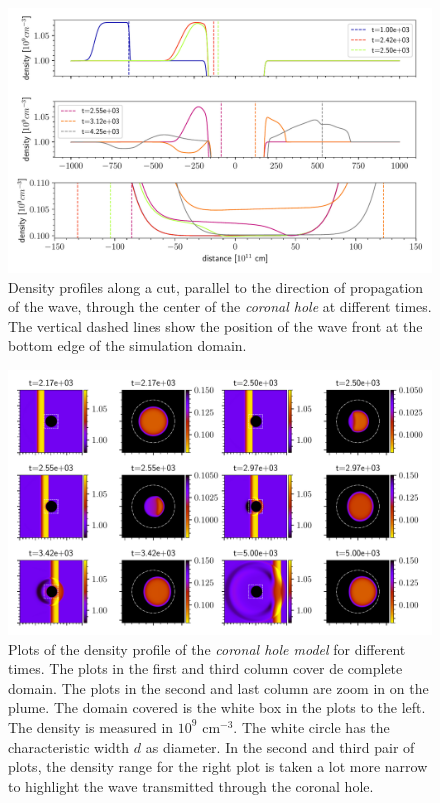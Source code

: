 \begin{figure}[H]
	\centering
	\includegraphics[width=\linewidth]{images/hole-sections.pdf}
	\caption{Density profiles along a cut, parallel to the direction of propagation of the wave, through the center of the \emph{coronal hole} at different times. The vertical dashed lines show the position of the wave front at the bottom edge of the simulation domain.}
	\label{fig:hole-sections}
\end{figure}

\begin{figure}[H]
	\centering
	\includegraphics[width=\linewidth]{images/hole-frames.pdf}
	\caption{Plots of the density profile of the \emph{coronal hole model} for different times. 
	The plots in the first and third column cover de complete domain.
	The plots in the second and last column are zoom in on the plume. 
	The domain covered is the white box in the plots to the left.
 The density is measured in $10^{9}$ cm$^{-3}$.
The white circle has the characteristic width $d$ as diameter. 
In the second and third pair of plots, the density range for the right plot is taken a lot more narrow to highlight the wave transmitted through the coronal hole.}
	\label{fig:hole-frames}
\end{figure}


